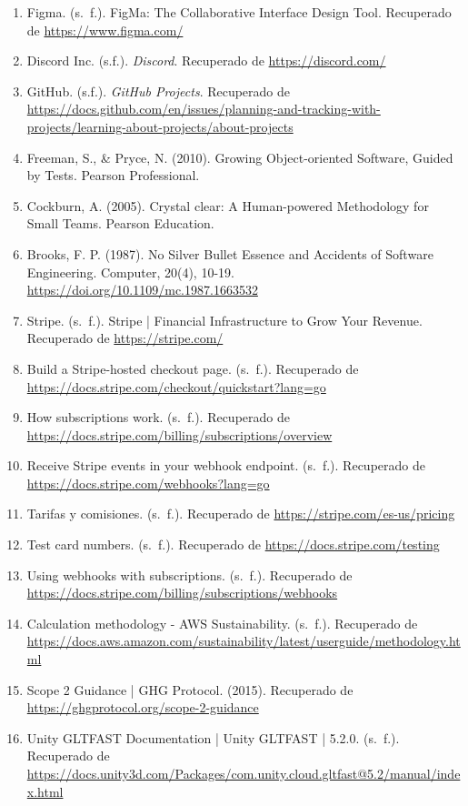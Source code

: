 \begin{enumerate}
  \item Figma. (s. f.). FigMa: The Collaborative Interface Design Tool. Recuperado de \url{https://www.figma.com/}
  \item Discord Inc. (s.f.). \textit{Discord}. Recuperado de \url{https://discord.com/}
  \item GitHub. (s.f.). \textit{GitHub Projects}. Recuperado de \url{https://docs.github.com/en/issues/planning-and-tracking-with-projects/learning-about-projects/about-projects}
  \item Freeman, S., & Pryce, N. (2010). Growing Object-oriented Software, Guided by Tests. Pearson Professional.
  \item Cockburn, A. (2005). Crystal clear: A Human-powered Methodology for Small Teams. Pearson Education.
  \item Brooks, F. P. (1987). No Silver Bullet Essence and Accidents of Software Engineering. Computer, 20(4), 10-19. \url{https://doi.org/10.1109/mc.1987.1663532}
  \item Stripe. (s. f.). Stripe | Financial Infrastructure to Grow Your Revenue. Recuperado de \url{https://stripe.com/}
  \item Build a Stripe-hosted checkout page. (s. f.). Recuperado de \url{https://docs.stripe.com/checkout/quickstart?lang=go}
  \item How subscriptions work. (s. f.). Recuperado de \url{https://docs.stripe.com/billing/subscriptions/overview} 
  \item Receive Stripe events in your webhook endpoint. (s. f.). Recuperado de \url{https://docs.stripe.com/webhooks?lang=go}
  \item Tarifas y comisiones. (s. f.). Recuperado de \url{https://stripe.com/es-us/pricing}
  \item Test card numbers. (s. f.). Recuperado de \url{https://docs.stripe.com/testing}
  \item Using webhooks with subscriptions. (s. f.). Recuperado de \url{https://docs.stripe.com/billing/subscriptions/webhooks}
  \item Calculation methodology - AWS Sustainability. (s. f.). Recuperado de \url{https://docs.aws.amazon.com/sustainability/latest/userguide/methodology.html}
  \item Scope 2 Guidance | GHG Protocol. (2015). Recuperado de \url{https://ghgprotocol.org/scope-2-guidance}
  \item Unity GLTFAST Documentation | Unity GLTFAST | 5.2.0. (s. f.). Recuperado de \url{https://docs.unity3d.com/Packages/com.unity.cloud.gltfast@5.2/manual/index.html}

\end{enumerate}
